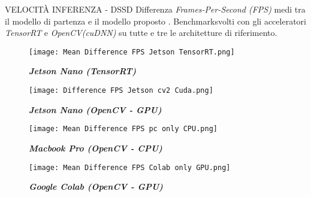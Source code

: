 
\begin{frame}{VELOCITÀ INFERENZA - DSSD}
    \renewcommand{\thefootnote}{\fnsymbol{footnote}}
    Differenza \emph{Frames-Per-Second (FPS)} medi tra il modello di partenza 
    {} e il modello proposto {}. Benchmark\footnotemark[1] svolti con gli acceleratori 
    \emph{TensorRT} e \emph{OpenCV(cuDNN)} su tutte e tre le architetture di riferimento.\\
    \vspace{0.2cm}
    \begin{minipage}{\linewidth}
        \centering
        \begin{minipage}{0.45\linewidth}
            \begin{figure}
                \centering
                \texttt{[image: Mean Difference FPS Jetson TensorRT.png]}
                \centering
                \vspace{-0.7cm} 
                \caption{{\bfseries{\emph{Jetson Nano (TensorRT)}}}}
            \end{figure}
        \end{minipage}
        \begin{minipage}{0.45\linewidth}
            \begin{figure}
                \centering
                \texttt{[image: Difference FPS Jetson cv2 Cuda.png]}
                \centering
                \vspace{-0.7cm} 
                \caption{{\bfseries{\emph{Jetson Nano (OpenCV - GPU)}}}}
            \end{figure}
        \end{minipage}
    \end{minipage}
    \begin{minipage}{\linewidth}
        \centering
        \begin{minipage}{0.45\linewidth}
            \begin{figure}
                \centering
                \texttt{[image: Mean Difference FPS pc only CPU.png]}
                \centering
                \vspace{-0.7cm} 
                \caption{{\bfseries{\emph{Macbook Pro (OpenCV - CPU)}}}}
            \end{figure}
        \end{minipage}
        \begin{minipage}{0.45\linewidth}
            \begin{figure}
                \centering
                \texttt{[image: Mean Difference FPS Colab only GPU.png]}
                \centering
                \vspace{-0.7cm} 
                \caption{{\bfseries{\emph{Google Colab (OpenCV - GPU)}}}}
            \end{figure}
        \end{minipage}
    \end{minipage}
\end{frame}
